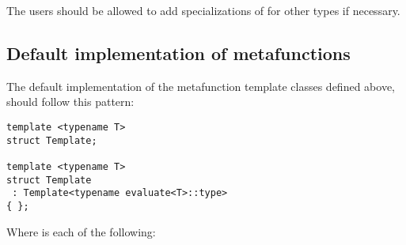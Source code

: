 The users should be allowed to add specializations of \verb@evaluate@
for other types if necessary.

\subsection{Default implementation of metafunctions}

The default implementation of the metafunction template classes defined above,
should follow this pattern:

\begin{verbatim}
template <typename T>
struct Template;

template <typename T>
struct Template
 : Template<typename evaluate<T>::type>
{ };
\end{verbatim}

Where \verb@Template@ is each of the following:

